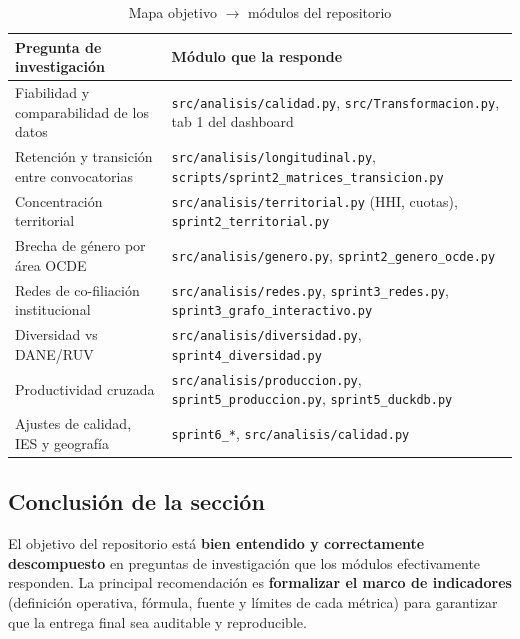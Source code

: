 \begin{table}[htbp]
\centering
\caption{Mapa objetivo $\rightarrow$ módulos del repositorio}
\label{tab:mapa_objetivo}
\small
\begin{tabularx}{\linewidth}{p{6.2cm}X}
\toprule
\textbf{Pregunta de investigación} & \textbf{Módulo que la responde} \\
\midrule
Fiabilidad y comparabilidad de los datos &
\texttt{src/analisis/calidad.py}, \texttt{src/Transformacion.py}, tab 1 del dashboard \\
Retención y transición entre convocatorias &
\texttt{src/analisis/longitudinal.py}, \texttt{scripts/sprint2\_matrices\_transicion.py} \\
Concentración territorial &
\texttt{src/analisis/territorial.py} (HHI, cuotas), \texttt{sprint2\_territorial.py} \\
Brecha de género por área OCDE &
\texttt{src/analisis/genero.py}, \texttt{sprint2\_genero\_ocde.py} \\
Redes de co-filiación institucional &
\texttt{src/analisis/redes.py}, \texttt{sprint3\_redes.py}, \texttt{sprint3\_grafo\_interactivo.py} \\
Diversidad vs DANE/RUV &
\texttt{src/analisis/diversidad.py}, \texttt{sprint4\_diversidad.py} \\
Productividad cruzada &
\texttt{src/analisis/produccion.py}, \texttt{sprint5\_produccion.py}, \texttt{sprint5\_duckdb.py} \\
Ajustes de calidad, IES y geografía &
\texttt{sprint6\_*}, \texttt{src/analisis/calidad.py} \\
\bottomrule
\end{tabularx}
\end{table}

\subsection{Conclusión de la sección}

El objetivo del repositorio está \textbf{bien entendido y correctamente
descompuesto} en preguntas de investigación que los módulos efectivamente
responden. La principal recomendación es \textbf{formalizar el marco de
indicadores} (definición operativa, fórmula, fuente y límites de cada métrica)
para garantizar que la entrega final sea auditable y reproducible.
